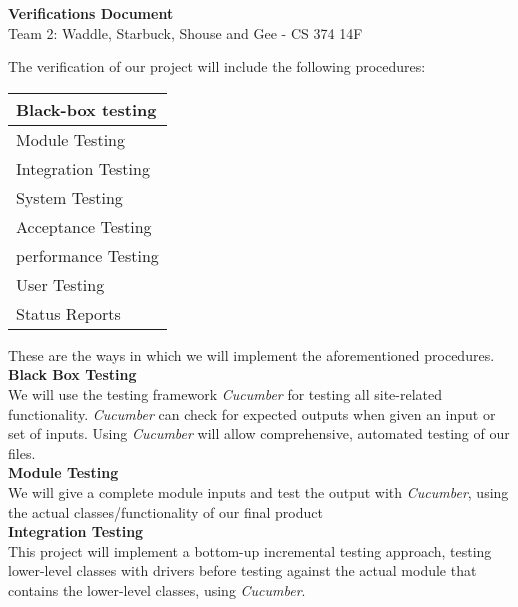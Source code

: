 \documentclass[11pt]{article}
\begin{document}
\begin{center}
  \large \textbf{Verifications Document} \\
  Team 2: Waddle, Starbuck, Shouse and Gee - CS 374 14F
\end{center}

The verification of our project will include the following procedures: \\
\begin{adjustwidth}{.75in}{}
  \begin{tabular}{|| l ||}
    \hline
    Black-box testing \\ \hline
    Module Testing \\ \hline
    Integration Testing \\ \hline
    System Testing \\ \hline
    Acceptance Testing \\ \hline
    performance Testing \\ \hline
    User Testing \\ \hline
    Status Reports \\ \hline
  \end{tabular}
\end{adjustwidth}
\vspace{.1in}

These are the ways in which we will implement the aforementioned procedures. \\

\hspace{-.5in} \textbf{Black Box Testing} \\

We will use the testing framework \textit{Cucumber} for testing all site-related functionality. \textit{Cucumber} can check for expected outputs when given an input
or set of inputs. Using \textit{Cucumber} will allow comprehensive, automated testing of our files. \\

\hspace{-.5in} \textbf{Module Testing} \\

We will give a complete module inputs and test the output with \textit{Cucumber}, using the actual classes/functionality of our final product \\

\hspace{-.5in} \textbf{Integration Testing} \\

This project will implement a bottom-up incremental testing approach, testing lower-level classes with drivers before testing against the actual
module that contains the lower-level classes, using \textit{Cucumber}. \\
\end{document}
